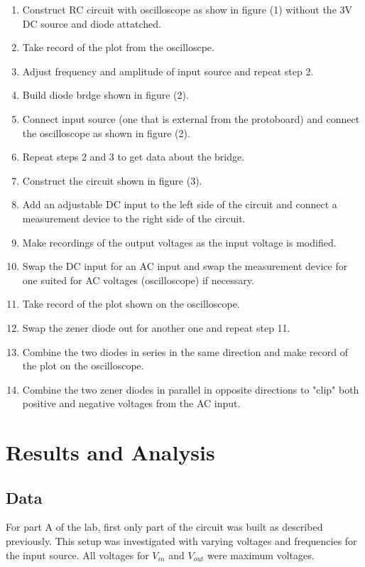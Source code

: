 \documentclass[twocolumn, amsmath]{revtex4}
\begin{document}
\begin{enumerate}
    \item Construct RC circuit with oscilloscope as show in figure (1) without the 3V DC source and diode attatched.
    \item Take record of the plot from the oscilloscpe.
    \item Adjust frequency and amplitude of input source and repeat step 2.
    \item Build diode brdge shown in figure (2).
    \item Connect input source (one that is external from the protoboard) and connect the oscilloscope as shown in figure (2).
    \item Repeat steps 2 and 3 to get data about the bridge.
    \item Construct the circuit shown in figure (3).
    \item Add an adjustable DC input to the left side of the circuit and connect a measurement device to the right side of the circuit.
    \item Make recordings of the output voltages as the input voltage is modified.
    \item Swap the DC input for an AC input and swap the measurement device for one suited for AC voltages (oscilloscope) if necessary.
    \item Take record of the plot shown on the oscilloscope.
    \item Swap the zener diode out for another one and repeat step 11.
    \item Combine the two diodes in series in the same direction and make record of the plot on the oscilloscope.
    \item Combine the two zener diodes in parallel in opposite directions to "clip" both positive and negative voltages from the AC input.
\end{enumerate}


\section{Results and Analysis}

\subsection{Data}
For part A of the lab, first only part of the circuit was built as described previously. This setup was investigated with varying voltages and frequencies for the input source. All voltages for $V_{in}$ and $V_{out}$ were maximum voltages.
\end{document}
